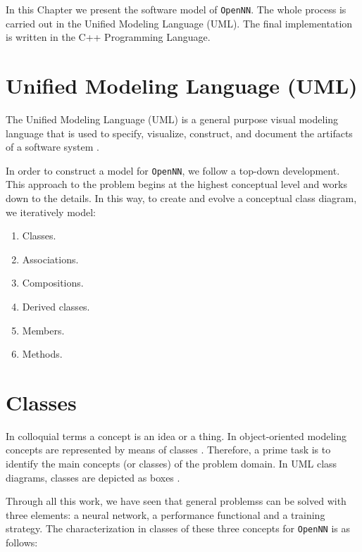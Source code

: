 In this Chapter we present the software model of \texttt{OpenNN}. 
The whole process is carried out in the Unified Modeling Language (UML).
The final implementation is written in the C++ Programming Language.

\section{Unified Modeling Language (UML)}

The Unified Modeling Language (UML) is a general purpose visual
modeling language that is used to specify, visualize, construct,
and document the artifacts of a software system
\cite{Rumbaugh1999}.

In order to construct a model for \texttt{OpenNN}, we
follow a top-down development. This approach to the problem begins
at the highest conceptual level and works down to the details. In
this way, to create and evolve a conceptual class diagram, we iteratively model:

\begin{enumerate}
\item Classes.
\item Associations.
\item Compositions.
\item Derived classes.
\item Members.
\item Methods.
\end{enumerate}

\section{Classes}


In colloquial terms a concept is an idea or a thing. In
object-oriented modeling concepts are represented by means of
classes \cite{Stroustrup2000}. Therefore, a prime task is to
identify the main concepts (or classes) of the problem domain. In
UML class diagrams, classes are depicted as boxes
\cite{Rumbaugh1999}.


Through all this work, we have seen that general problemss can be solved 
with three elements: a neural network, a
performance functional and a training strategy. The characterization
in classes of these three concepts for \texttt{OpenNN} is
as follows:

